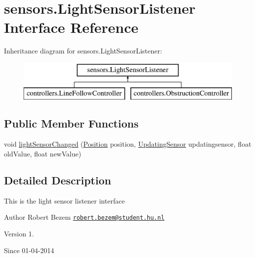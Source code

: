 \hypertarget{interfacesensors_1_1_light_sensor_listener}{\section{sensors.\-Light\-Sensor\-Listener Interface Reference}
\label{interfacesensors_1_1_light_sensor_listener}
}
Inheritance diagram for sensors.\-Light\-Sensor\-Listener\-:\begin{figure}[H]
\begin{center}
\leavevmode
\includegraphics[height=2.000000cm]{interfacesensors_1_1_light_sensor_listener}
\end{center}
\end{figure}
\subsection*{Public Member Functions}
\begin{DoxyCompactItemize}
\item 
void \hyperlink{interfacesensors_1_1_light_sensor_listener_ad454a7e5082bc820b4cc27cf173a111a}{light\-Sensor\-Changed} (\hyperlink{enumsensors_1_1_position}{Position} position, \hyperlink{interfacesensors_1_1_updating_sensor}{Updating\-Sensor} updatingsensor, float old\-Value, float new\-Value)
\end{DoxyCompactItemize}


\subsection{Detailed Description}
This is the light sensor listener interface

\begin{DoxyAuthor}{Author}
Robert Bezem \href{mailto:robert.bezem@student.hu.nl}{\tt robert.\-bezem@student.\-hu.\-nl} 
\end{DoxyAuthor}
\begin{DoxyVersion}{Version}
1. 
\end{DoxyVersion}
\begin{DoxySince}{Since}
01-\/04-\/2014 
\end{DoxySince}


